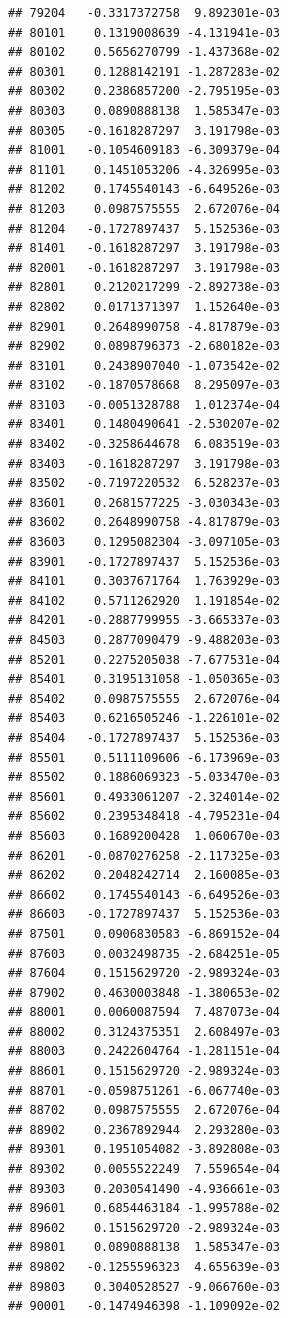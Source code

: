 \begin{frame}[fragile]
\begin{verbatim}
## 79204   -0.3317372758  9.892301e-03
## 80101    0.1319008639 -4.131941e-03
## 80102    0.5656270799 -1.437368e-02
## 80301    0.1288142191 -1.287283e-02
## 80302    0.2386857200 -2.795195e-03
## 80303    0.0890888138  1.585347e-03
## 80305   -0.1618287297  3.191798e-03
## 81001   -0.1054609183 -6.309379e-04
## 81101    0.1451053206 -4.326995e-03
## 81202    0.1745540143 -6.649526e-03
## 81203    0.0987575555  2.672076e-04
## 81204   -0.1727897437  5.152536e-03
## 81401   -0.1618287297  3.191798e-03
## 82001   -0.1618287297  3.191798e-03
## 82801    0.2120217299 -2.892738e-03
## 82802    0.0171371397  1.152640e-03
## 82901    0.2648990758 -4.817879e-03
## 82902    0.0898796373 -2.680182e-03
## 83101    0.2438907040 -1.073542e-02
## 83102   -0.1870578668  8.295097e-03
## 83103   -0.0051328788  1.012374e-04
## 83401    0.1480490641 -2.530207e-02
## 83402   -0.3258644678  6.083519e-03
## 83403   -0.1618287297  3.191798e-03
## 83502   -0.7197220532  6.528237e-03
## 83601    0.2681577225 -3.030343e-03
## 83602    0.2648990758 -4.817879e-03
## 83603    0.1295082304 -3.097105e-03
## 83901   -0.1727897437  5.152536e-03
## 84101    0.3037671764  1.763929e-03
## 84102    0.5711262920  1.191854e-02
## 84201   -0.2887799955 -3.665337e-03
## 84503    0.2877090479 -9.488203e-03
## 85201    0.2275205038 -7.677531e-04
## 85401    0.3195131058 -1.050365e-03
## 85402    0.0987575555  2.672076e-04
## 85403    0.6216505246 -1.226101e-02
## 85404   -0.1727897437  5.152536e-03
## 85501    0.5111109606 -6.173969e-03
## 85502    0.1886069323 -5.033470e-03
## 85601    0.4933061207 -2.324014e-02
## 85602    0.2395348418 -4.795231e-04
## 85603    0.1689200428  1.060670e-03
## 86201   -0.0870276258 -2.117325e-03
## 86202    0.2048242714  2.160085e-03
## 86602    0.1745540143 -6.649526e-03
## 86603   -0.1727897437  5.152536e-03
## 87501    0.0906830583 -6.869152e-04
## 87603    0.0032498735 -2.684251e-05
## 87604    0.1515629720 -2.989324e-03
## 87902    0.4630003848 -1.380653e-02
## 88001    0.0060087594  7.487073e-04
## 88002    0.3124375351  2.608497e-03
## 88003    0.2422604764 -1.281151e-04
## 88601    0.1515629720 -2.989324e-03
## 88701   -0.0598751261 -6.067740e-03
## 88702    0.0987575555  2.672076e-04
## 88902    0.2367892944  2.293280e-03
## 89301    0.1951054082 -3.892808e-03
## 89302    0.0055522249  7.559654e-04
## 89303    0.2030541490 -4.936661e-03
## 89601    0.6854463184 -1.995788e-02
## 89602    0.1515629720 -2.989324e-03
## 89801    0.0890888138  1.585347e-03
## 89802   -0.1255596323  4.655639e-03
## 89803    0.3040528527 -9.066760e-03
## 90001   -0.1474946398 -1.109092e-02

\end{verbatim}
\end{frame}
